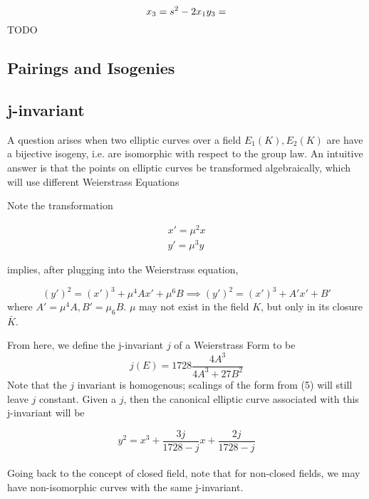 \documentclass[12pt,twoside]{article}
\begin{document}
\begin{equation}
x_{3} = s^{2} - 2x_{1} \\
y_{3} = 
\end{equation} 
TODO




\subsection{Pairings and Isogenies} 


\subsection{j-invariant} 
A question arises when two elliptic curves over a field $E_{1}(K), E_{2}(K)$ are have a bijective isogeny, i.e. are isomorphic with respect to the group law. 
An intuitive answer is that the points on elliptic curves be transformed algebraically, which will use different Weierstrass Equations

Note the transformation  

\begin{align*}
x' = \mu^{2}x \\   
y' = \mu^{3}y 
\end{align*}

implies, after plugging into the Weierstrass equation,

\begin{equation} 
(y')^{2} = (x')^{3} + \mu^{4}Ax' +\mu^{6}B \implies (y')^{2} = (x')^{3} + A'x' + B'  
\end{equation} 
where $A' = \mu^{4}A, B' = \mu_{6}B$. $\mu$ may not exist in the field $K$, but only in its closure $\bar{K}$. 

From here, we define the j-invariant $j$ of a Weierstrass Form to be 
\begin{equation} 
j(E) = 1728 \frac{4A^{3}}{4A^{3} + 27B^{2}}
\end{equation}
Note that the $j$ invariant is homogenous; scalings of the form from (5) will still leave $j$ constant. Given a $j$, then the canonical elliptic curve associated with this j-invariant will be 

\begin{equation} 
y^{2}  = x^{3} + \frac{3j}{1728 - j}x + \frac{2j}{1728 - j} 
\end{equation}
\\
Going back to the concept of closed field, note that for non-closed fields, we may have non-isomorphic curves with the same j-invariant. 
\end{document}
